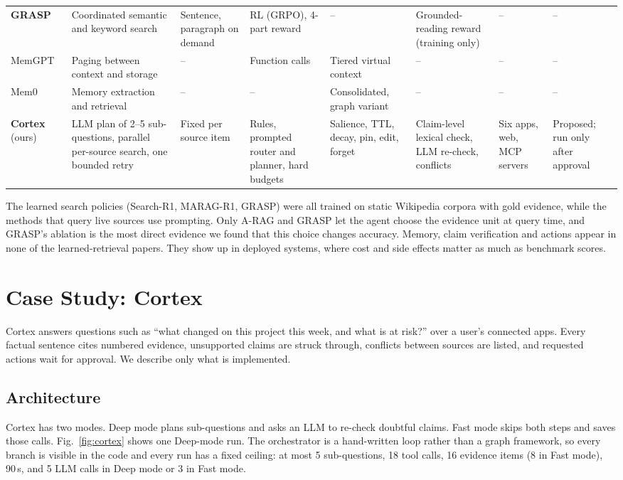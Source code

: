\documentclass[conference]{IEEEtran}
\begin{document}
\begin{table}[t]
\begin{tabular}{@{}p{1.55cm}p{3.05cm}p{2.05cm}p{2.0cm}p{1.75cm}p{2.25cm}p{1.75cm}p{1.6cm}@{}}
\textbf{GRASP}~\cite{gandhi2026grasp} & Coordinated semantic and keyword search & Sentence, paragraph on demand & RL (GRPO), 4-part reward & -- & Grounded-reading reward (training only) & -- & -- \\
MemGPT~\cite{packer2023memgpt} & Paging between context and storage & -- & Function calls & Tiered virtual context & -- & -- & -- \\
Mem0~\cite{chhikara2025mem0} & Memory extraction and retrieval & -- & -- & Consolidated, graph variant & -- & -- & -- \\
\midrule
\textbf{Cortex} (ours) & LLM plan of 2--5 sub-questions, parallel per-source search, one bounded retry & Fixed per source item & Rules, prompted router and planner, hard budgets & Salience, TTL, decay, pin, edit, forget & Claim-level lexical check, LLM re-check, conflicts & Six apps, web, MCP servers & Proposed; run only after approval \\
\bottomrule
\end{tabular}
\end{table}

The learned search policies (Search-R1, MARAG-R1, GRASP) were all trained on static Wikipedia corpora with gold evidence, while the methods that query live sources use prompting. Only A-RAG and GRASP let the agent choose the evidence unit at query time, and GRASP's ablation is the most direct evidence we found that this choice changes accuracy. Memory, claim verification and actions appear in none of the learned-retrieval papers. They show up in deployed systems, where cost and side effects matter as much as benchmark scores.

\section{Case Study: Cortex}
\label{sec:cortex}

Cortex answers questions such as ``what changed on this project this week, and what is at risk?'' over a user's connected apps. Every factual sentence cites numbered evidence, unsupported claims are struck through, conflicts between sources are listed, and requested actions wait for approval. We describe only what is implemented.

\subsection{Architecture}
Cortex has two modes. Deep mode plans sub-questions and asks an LLM to re-check doubtful claims. Fast mode skips both steps and saves those calls. Fig.~\ref{fig:cortex} shows one Deep-mode run. The orchestrator is a hand-written loop rather than a graph framework, so every branch is visible in the code and every run has a fixed ceiling: at most 5 sub-questions, 18 tool calls, 16 evidence items (8 in Fast mode), 90\,s, and 5 LLM calls in Deep mode or 3 in Fast mode.
\end{document}
